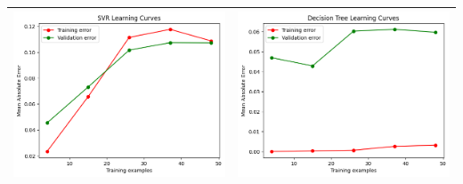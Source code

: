 \begin{table}[H]
    \centering
    \footnotesize
    \setlength\tabcolsep{0pt}
    \begin{tabularx}{\textwidth}{|X|X|}
        \hline
        \includegraphics[width=\linewidth, trim=0 0 0 0]{images/SVR_lc60_Azure.png} &
        \includegraphics[width=\linewidth, trim=0 0 0 0]{images/DecisionTree_lc60_Azure.png} \\
        \hline

\end{tabularx}
\end{table}
